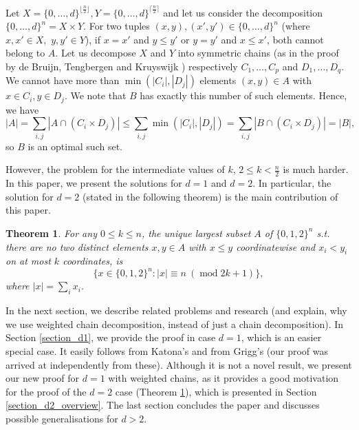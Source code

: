 \documentclass[11pt, reqno]{amsart}
\newtheorem{theorem}{Theorem}
\numberwithin{equation}{section}
\newcommand{\cube}{\{0, 1, 2\}^n}
\newcommand\modd{\operatorname{mod}}
\begin{document}
Let $X=\{0, \dots, d\}^{\lfloor \frac{n}{2} \rfloor}, Y=\{0, \dots, d\}^{\lceil \frac{n}{2} \rceil}$ and let us consider the decomposition $\{0, \dots, d\}^n=X \times Y$. For two tuples $(x, y), (x', y') \in \{0, \dots, d\}^n$ (where $x, x' \in X,$ $y, y' \in Y$), if $x=x'$ and $y \leqslant y'$ or $y=y'$ and $x \leqslant x'$, both cannot belong to $A$. Let us decompose $X$ and $Y$ into symmetric chains (as in the proof by de Bruijn, Tengbergen and Kruyswijk \cite{symmetric_chain_decomposition}) respectively $C_1, \dots, C_p$ and $D_1, \dots, D_q$. We cannot have more than $\min(|C_i|, |D_j|)$ elements $(x, y) \in A$ with $x \in C_i, y \in D_j$. We note that $B$ has exactly this number of such elements. Hence, we have
\begin{equation}
    |A|= \sum_{i, j} |A \cap (C_i \times D_j)| \leqslant \sum_{i, j} \min(|C_i|, |D_j|) =  \sum_{i, j} |B \cap (C_i \times D_j)| = |B|,
\end{equation}
so $B$ is an optimal such set.

However, the problem for the intermediate values of $k$, $2 \leqslant k < \frac{n}{2}$ is much harder. In this paper, we present the solutions for $d=1$ and $d=2$. In particular, the solution for $d=2$ (stated in the following theorem) is the main contribution of this paper.

\begin{theorem}
\label{the_main_theorem}
    For any $0 \leqslant k \leqslant n$, the unique largest subset $A$ of $\cube$ s.t. there are no two distinct elements $x, y \in A$ with $x \leqslant y$ coordinatewise and $x_i < y_i$ on at most $k$ coordinates, is
    \begin{equation*}
        \Big\{ x \in \cube: |x| \equiv n \ (\modd 2k+1) \Big\},
    \end{equation*}
    where $|x|=\sum_i x_i$.
\end{theorem}

In the next section, we describe related problems and research (and explain, why we use weighted chain decomposition, instead of just a chain decomposition). In Section \ref{section_d1}, we provide the proof in case $d=1$, which is an easier special case. It easily follows from Katona's \cite{katona} and from Grigg's \cite{griggs} (our proof was arrived at independently from these). Although it is not a novel result, we present our new proof for $d=1$ with weighted chains, as it provides a good motivation for the proof of the $d=2$ case (Theorem \ref{the_main_theorem}), which is presented in Section \ref{section_d2_overview}. The last section concludes the paper and discusses possible generalisations for $d>2$.
\end{document}
